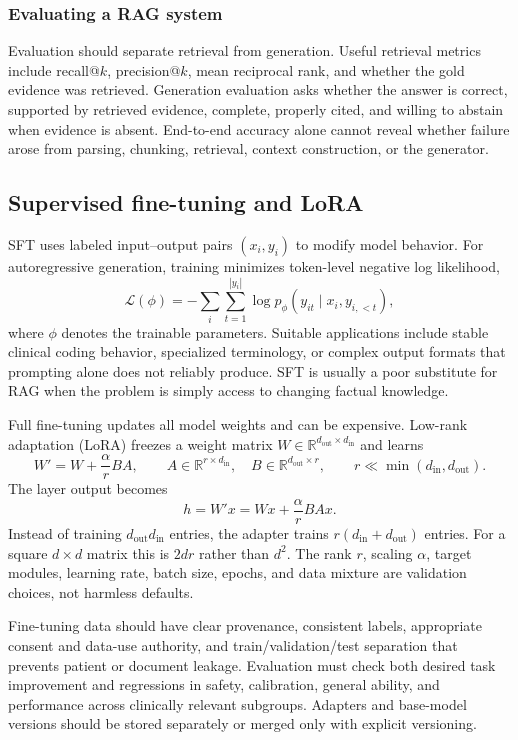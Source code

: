 \documentclass[12pt,oneside]{book}
\numberwithin{equation}{section}
\theoremstyle{definition}
\theoremstyle{plain}
\theoremstyle{remark}
\newcommand{\R}{\mathbb{R}}
\begin{document}
\subsubsection{Evaluating a RAG system}

Evaluation should separate retrieval from generation.  Useful retrieval metrics
include recall@$k$, precision@$k$, mean reciprocal rank, and whether the gold
evidence was retrieved.  Generation evaluation asks whether the answer is
correct, supported by retrieved evidence, complete, properly cited, and willing
to abstain when evidence is absent.  End-to-end accuracy alone cannot reveal
whether failure arose from parsing, chunking, retrieval, context construction,
or the generator.

\subsection{Supervised fine-tuning and LoRA}

SFT uses labeled input--output pairs $(x_i,y_i)$ to modify model behavior.  For
autoregressive generation, training minimizes token-level negative log
likelihood,
\[
 \mathcal L(\phi)
 =-\sum_i\sum_{t=1}^{|y_i|}
 \log p_\phi(y_{it}\mid x_i,y_{i,<t}),
\]
where $\phi$ denotes the trainable parameters.  Suitable applications include
stable clinical coding behavior, specialized terminology, or complex output
formats that prompting alone does not reliably produce.  SFT is usually a poor
substitute for RAG when the problem is simply access to changing factual
knowledge.

Full fine-tuning updates all model weights and can be expensive.  Low-rank
adaptation (LoRA) freezes a weight matrix $W\in\R^{d_{\mathrm{out}}\times
d_{\mathrm{in}}}$ and learns
\[
 W'=W+\frac{\alpha}{r}BA,
 \qquad
 A\in\R^{r\times d_{\mathrm{in}}},\quad
 B\in\R^{d_{\mathrm{out}}\times r},
 \qquad r\ll\min(d_{\mathrm{in}},d_{\mathrm{out}}).
\]
The layer output becomes
\[
 h=W'x=Wx+\frac{\alpha}{r}BAx.
\]
Instead of training $d_{\mathrm{out}}d_{\mathrm{in}}$ entries, the adapter
trains $r(d_{\mathrm{in}}+d_{\mathrm{out}})$ entries.  For a square $d\times d$
matrix this is $2dr$ rather than $d^2$.  The rank $r$, scaling $\alpha$, target
modules, learning rate, batch size, epochs, and data mixture are validation
choices, not harmless defaults.

Fine-tuning data should have clear provenance, consistent labels, appropriate
consent and data-use authority, and train/validation/test separation that
prevents patient or document leakage.  Evaluation must check both desired task
improvement and regressions in safety, calibration, general ability, and
performance across clinically relevant subgroups.  Adapters and base-model
versions should be stored separately or merged only with explicit versioning.
\end{document}
